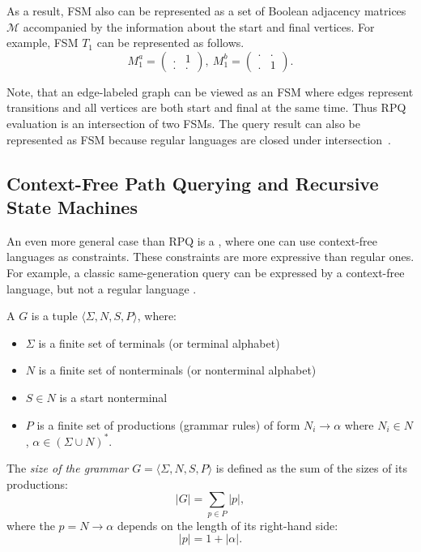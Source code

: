 As a result, FSM also can be represented as a set of Boolean adjacency matrices $\mathcal{M}$ accompanied by the information about the start and final vertices.
For example, FSM $T_1$ can be represented as follows.
$$
M_1^a =
\begin{pmatrix}
.&1 \\
.&.
\end{pmatrix},~
M_1^b =
\begin{pmatrix}
.&. \\
.&1
\end{pmatrix}.
$$

Note, that an edge-labeled graph can be viewed as an FSM where edges represent transitions and all vertices are both start and final at the same time.
Thus RPQ evaluation is an intersection of two FSMs.
The query result can also be represented as FSM because regular languages are closed under intersection~\citep{automata:theory:10.5555/1177300}.

\subsection{Context-Free Path Querying and Recursive State Machines}

An even more general case than RPQ is a , where one can use context-free languages as constraints.
These constraints are more expressive than regular ones.
For example, a classic same-generation query can be expressed by a context-free language, but not a regular language \citep{databasebook}.

\begin{definition}
A  $G$ is a tuple $\langle\Sigma, N, S, P\rangle$, where:
\begin{itemize}
    \item $\Sigma$ is a finite set of terminals (or terminal alphabet)
    \item $N$ is a finite set of nonterminals (or nonterminal alphabet)
    \item $S \in N$ is a start nonterminal
    \item $P$ is a finite set of productions (grammar rules) of form $N_i \to \alpha$ where  $N_i \in N$, $\alpha \in (\Sigma \cup N)^*$.
\end{itemize}
\end{definition}

\begin{definition}

    The \emph{size of the grammar} $G = \langle \Sigma, N, S, P \rangle$ is defined as the sum of the sizes of its productions:
    \[|G| = \sum_{p \in P} |p|,\]
    where the  $p = N \to \alpha$ depends on the length of its right-hand side:
    \[|p| = 1 + |\alpha|.\]

\end{definition}

